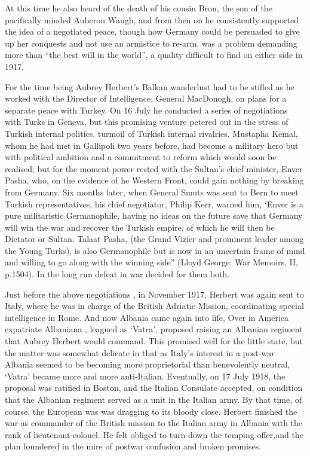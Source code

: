 At this time he also heard of the death of his cousin Bron, the son of the pacifically minded Auberon Waugh, and from then on he consistently supported the idea of a negotiated peace, though how Germany could be persuaded to give up her conquests and not use an armistice to re-arm. was a problem demanding more than “the best will in the world”, a quality difficult to find on either side in 1917.

For the time being Aubrey Herbert’s Balkan wanderlust had to be stifled as he worked with the Director of Intelligence, General MacDonogh, on plans for a separate peace with Turkey. On 16 July he conducted a series of negotiations with Turks in Geneva, but this promising venture petered out in the stress of Turkish internal politics. turmoil of Turkish internal rivalries. Mustapha Kemal, whom he had met in Gallipoli two years before, had become a military hero but with political ambition and a commitment to reform which would soon be realised; but for the moment power rested with the Sultan’s chief minister, Enver Pasha, who, on the evidence of he Western Front, could gain nothing by breaking from Germany. Six months later, when General Smuts was sent to Bern to meet Turkish representatives, his chief negotiator, Philip Kerr, warned him, ‘Enver is a pure militaristic Germanophile, having no ideas on the future save that Germany will win the war and recover the Turkish empire, of which he will then be Dictator or Sultan. Talaat Pasha, (the Grand Vizier and prominent leader among the Young Turks), is also Germanophile but is now in an uncertain frame of mind and willing to go along with the winning side” (Lloyd George: War Memoirs, II, p.1504). In the long run defeat in war decided for them both. 

Just before the above negotiations , in November 1917, Herbert was again sent to Italy, where he was in charge of the British Adriatic Mission, coordinating special intelligence in Rome. And now Albania came again into life, Over in America expatriate Albaniana , leagued as ‘Vatra’, proposed raising an Albanian regiment that Aubrey Herbert would command. This promised well for the little state, but the matter was somewhat delicate in that as Italy's interest in a post-war Albania seemed to be becoming more proprietorial than benevolently neutral, ‘Vatra’ became more and more anti-Italian. Eventually, on 17 July 1918, the proposal was ratified in Boston, and the Italian Consulate accepted, on condition that the Albanian regiment served as a unit in the Italian army. By that time, of course, the European was was dragging to its bloody close. Herbert finished the war as commander of the British mission to the Italian army in Albania with the rank of lieutenant-colonel. He felt obliged to turn down the temping offer,and the plan foundered in the mire of postwar confusion and broken promises.

